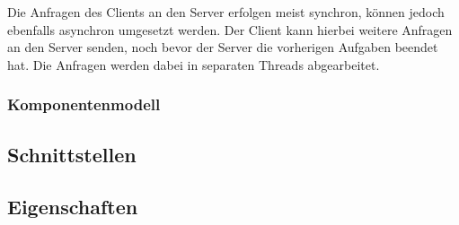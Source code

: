 Die Anfragen des Clients an den Server erfolgen meist synchron, können jedoch ebenfalls asynchron umgesetzt werden. \cite{schill:2012}
Der Client kann hierbei weitere Anfragen an den Server senden, noch bevor der Server die vorherigen Aufgaben beendet hat. Die Anfragen werden dabei in separaten Threads abgearbeitet. \cite{abts:2019}

\subsubsection{Komponentenmodell}

\subsection{Schnittstellen}

\subsection{Eigenschaften}



